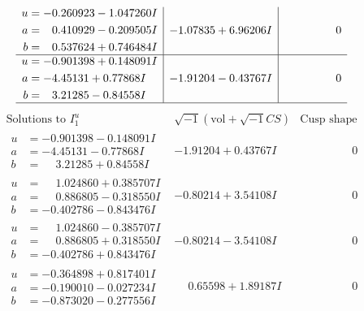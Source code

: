 \documentclass[1p]{elsarticle_modified}
\theoremstyle{definition}
\newcommand{\I}{\sqrt{-1}}
\begin{document}
$$\begin{array}{c|c|c}
\begin{aligned}
u &= -0.260923 - 1.047260 I \\
a &= \phantom{-}0.410929 - 0.209505 I \\
b &= \phantom{-}0.537624 + 0.746484 I\end{aligned}
 & -1.07835 + 6.96206 I & \phantom{-0.000000 } 0 \\ \hline\begin{aligned}
u &= -0.901398 + 0.148091 I \\
a &= -4.45131 + 0.77868 I \\
b &= \phantom{-}3.21285 - 0.84558 I\end{aligned}
 & -1.91204 - 0.43767 I & \phantom{-0.000000 } 0\\
 \hline 
 \end{array}$$\newpage$$\begin{array}{c|c|c}  
\text{Solutions to }I^u_{1}& \I (\text{vol} + \sqrt{-1}CS) & \text{Cusp shape}\\
 \hline 
\begin{aligned}
u &= -0.901398 - 0.148091 I \\
a &= -4.45131 - 0.77868 I \\
b &= \phantom{-}3.21285 + 0.84558 I\end{aligned}
 & -1.91204 + 0.43767 I & \phantom{-0.000000 } 0 \\ \hline\begin{aligned}
u &= \phantom{-}1.024860 + 0.385707 I \\
a &= \phantom{-}0.886805 - 0.318550 I \\
b &= -0.402786 - 0.843476 I\end{aligned}
 & -0.80214 + 3.54108 I & \phantom{-0.000000 } 0 \\ \hline\begin{aligned}
u &= \phantom{-}1.024860 - 0.385707 I \\
a &= \phantom{-}0.886805 + 0.318550 I \\
b &= -0.402786 + 0.843476 I\end{aligned}
 & -0.80214 - 3.54108 I & \phantom{-0.000000 } 0 \\ \hline\begin{aligned}
u &= -0.364898 + 0.817401 I \\
a &= -0.190010 - 0.027234 I \\
b &= -0.873020 - 0.277556 I\end{aligned}
 & \phantom{-}0.65598 + 1.89187 I & \phantom{-0.000000 } 0 \\ \hline\begin{aligned}

\end{aligned}
\end{array}$$
\end{document}
